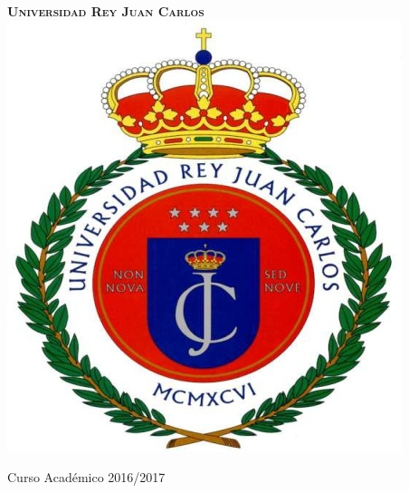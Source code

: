 \renewcommand{\refname}{Bibliografía}  %
\renewcommand{\appendixname}{Apéndice}


\begin{titlepage}
\begin{center}
\Huge
\textsc{\textbf{Universidad Rey Juan Carlos}} \\
\vspace{1cm}
\includegraphics[scale=1]{img/logoportada.png}

\vspace{1cm}
\large\textsc{\textbf{\TFM}}

\vspace{0.7cm}

\begin{mdframed}
\begin{center}
\vspace{0.5cm}
\textsc{\titulo}
\vspace{0.5cm}
\end{center}
\end{mdframed}

\textsc{\master}

\large
\especialidad

Curso Académico 2016/2017


\end{center}
\end{titlepage}

